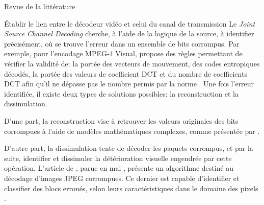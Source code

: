 \documentclass[letterpaper, twoside, 12pt,memoire]{thETS}
\begin{document}
\begin{chapter}{Revue de la littérature}
\begin{section}{Établir le lien entre le décodeur vidéo et celui du canal de
transmission}
Le \textit{Joint Source Channel Decoding} \citep{Duhamel2010} cherche, à l'aide
de la logique de la source, à identifier précisément, où se trouve l'erreur dans
un ensemble de bits corrompus. Par exemple, pour l'encodage MPEG-4 Visual,
\citeauthor{Talluri1998} propose des règles permettant de vérifier la validité
de: la portée des vecteurs de mouvement, des codes entropiques décodés, la
portée des valeurs de coefficient DCT et du nombre de coefficients DCT afin
qu'il ne dépasse pas le nombre permis par la norme \citep{Talluri1998}. Une fois
l'erreur identifiée, il existe deux types de solutions possibles: la reconstruction et la dissimulation.

D'une part, la reconstruction vise à retrouver les valeurs originales des bits
corrompues à l'aide de modèles mathématiques complexes, comme présentée par
\citet{Duhamel2010}.

D'autre part, la dissimulation tente de décoder les paquets corrompus, et par la
suite, identifier et dissimuler la détérioration visuelle engendrée par cette
opération. L'article de \citeauthor{Ye2003}, parue en mai \citeyear{Ye2003},
présente un algorithme destiné au décodage d'images JPEG corrompues. Ce dernier
est capable d'identifier et classifier des blocs erronés, selon leurs
caractéristiques dans le domaine des pixels \citep{Ye2003}.


\end{section}
\end{chapter}
\end{document}
